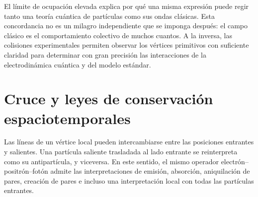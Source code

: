 \begin{classroomqa}
\end{classroomqa}

\begin{classroomqa}
\end{classroomqa}

El límite de ocupación elevada explica por qué una misma expresión puede regir tanto una teoría cuántica de partículas como sus ondas clásicas. Esta concordancia no es un milagro independiente que se imponga después: el campo clásico es el comportamiento colectivo de muchos cuantos. A la inversa, las colisiones experimentales permiten observar los vértices primitivos con suficiente claridad para determinar con gran precisión las interacciones de la electrodinámica cuántica y del modelo estándar.

\section{Cruce y leyes de conservación espaciotemporales}

Las líneas de un vértice local pueden intercambiarse entre las posiciones entrantes y salientes. Una partícula saliente trasladada al lado entrante se reinterpreta como su antipartícula, y viceversa. En este sentido, el mismo operador electrón--positrón--fotón admite las interpretaciones de emisión, absorción, aniquilación de pares, creación de pares e incluso una interpretación local con todas las partículas entrantes.

